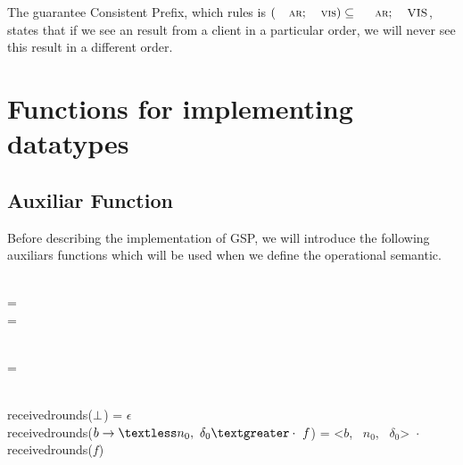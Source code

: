 \documentclass[envcountsect,runningheads,orivec]{llncs}
\begin{document}
The guarantee Consistent Prefix, which rules is $(\textsc{\small{ar}};\textsc{\small{vis}}) \subseteq \ \textsc{\small{ar}};\textsc{\small{VIS}}$, states that if we see an result from a client in a particular order, we will never see this result in a different order.


 
 \appendix
 
 \section{Functions for implementing datatypes}
 \subsection{Auxiliar Function}

Before describing the implementation of GSP, we will introduce the following auxiliars functions which will be used when we define the operational semantic.

\footnotesize
\ttfamily


\begin{flushleft}
 \\
\append{\gssegmentins{$\delta$}{\maxround}}{$\epsilon$} = \gssegmentins{$\delta$}{\maxround} \\
\append{\gssegmentins{$\delta$}{\maxround}}{$\headerround$:\tailround} =  
\end{flushleft}

\begin{flushleft}
 \\
 =  \gsprefixins{\applyplus{\state}{$\delta$ $\cdot$ $\epsilon$}}{\maxround[$\maxround'$]}  \\
\end{flushleft}

\begin{flushleft}
\\
receivedrounds($\perp$) = $\epsilon$ \\
receivedrounds($\partialfunction{b}{\textless n_0,\ \delta_0 \textgreater} \cdot\ f$) = \textless $b$, \ $n_0$, \ $\delta_0$\textgreater\ $\cdot$ receivedrounds($f$)
\end{flushleft}
\end{document}
